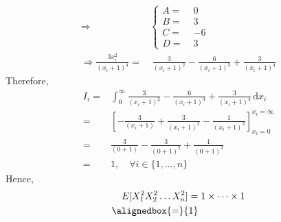 \documentclass{mthe353answer}
\begin{document}
\begin{questions}
\begin{align*}
      \Rightarrow& \left\{
        \begin{aligned}
          A =&\; 0\\
          B =&\; 3\\
          C =&\; {-6}\\
          D =&\; 3
        \end{aligned}
      \right.\\
      \Rightarrow \frac{3x_i^2}{(x_i+1)^4} =&\; \frac{3}{(x_i+1)^2} - \frac{6}{(x_i+1)^3} + \frac{3}{(x_i+1)^4}
    \end{align*}
    Therefore,
    \begin{align*}
      I_i =& \int_{0}^{\infty} \frac{3}{(x_i+1)^2} - \frac{6}{(x_i+1)^3} + \frac{3}{(x_i+1)^4} \, \mathrm{d}x_i\\
      =& \left[-\frac{3}{(x_i+1)} + \frac{3}{(x_i+1)^2} - \frac{1}{(x_i+1)^3}\right]_{x_i=0}^{x_i=\infty}\\
      =& \frac{3}{(0+1)} - \frac{3}{(0+1)^2} + \frac{1}{(0+1)^3}\\
      =& 1, \quad \forall i \in \{1, \dots, n\}
    \end{align*}
    Hence,
    \begin{align*}
      E[X_1^2X_2^2 \dots X_n^2] =&\; 1 \times \cdots \times 1\\
      \alignedbox{=}{1}
    \end{align*}
  \end{questions}
\end{document}
